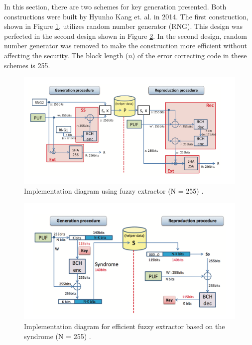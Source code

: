In this section, there are two schemes for key generation presented. Both constructions were built by Hyunho Kang et. al. in 2014. The first construction, shown in Figure \ref{fig:cryptographic_key_generation_old}, utilizes random number generator (RNG). This design was perfected in the second design shown in Figure \ref{fig:cryptographic_key_generation}. In the second design, random number generator was removed to make the construction more efficient without affecting the security.
The block length ($n$) of the error correcting code in these schemes is 255.

\begin{figure}[tph!]
    \centerline{\includegraphics[width={\textwidth}]{images/crypt_key_generation_old}}
    \caption{Implementation diagram using fuzzy extractor (N = 255) \cite{cryptographic_key_generation_old}.}
    \label{fig:cryptographic_key_generation_old}
\end{figure}

\begin{figure}[tph!]
    \centerline{\includegraphics[width={\textwidth}]{images/crypt_key_generation}}
    \caption{Implementation diagram for efficient fuzzy extractor based on the syndrome (N = 255) \cite{cryptographic_key_generation}.}
    \label{fig:cryptographic_key_generation}
\end{figure}

